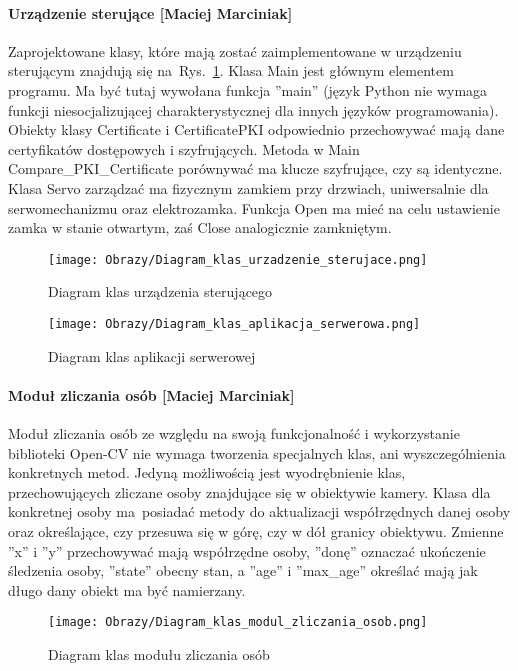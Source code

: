 \paragraph*{Urządzenie sterujące [Maciej Marciniak]}
Zaprojektowane klasy, które mają zostać zaimplementowane w urządzeniu sterującym znajdują się na~Rys.~\ref{diagram:Diagram_klas_urzadzenia_sterujacego}. Klasa Main jest głównym elementem programu. Ma być tutaj wywołana funkcja ''main'' (język Python nie wymaga funkcji niesocjalizującej charakterystycznej dla innych języków programowania). Obiekty klasy Certificate i CertificatePKI odpowiednio przechowywać mają dane certyfikatów dostępowych i szyfrujących. Metoda w Main Compare\_PKI\_Certificate porównywać ma klucze szyfrujące, czy są identyczne. Klasa Servo zarządzać ma fizycznym zamkiem przy drzwiach, uniwersalnie dla serwomechanizmu oraz elektrozamka. Funkcja Open ma mieć na celu ustawienie zamka w stanie otwartym, zaś Close analogicznie zamkniętym. 

\begin{figure}[!h]
	\centering
	\texttt{[image: Obrazy/Diagram\_klas\_urzadzenie\_sterujace.png]}
	\caption{Diagram klas urządzenia sterującego}
	\label{diagram:Diagram_klas_urzadzenia_sterujacego}
\end{figure}

\begin{landscape}
	\begin{figure}[!h]
		\centering
		\vspace{2.5cm}
		\texttt{[image: Obrazy/Diagram\_klas\_aplikacja\_serwerowa.png]}
		\caption{Diagram klas aplikacji serwerowej}
		\label{diagram:Diagram_klas_aplikacji_serwerowej}
	\end{figure}	
\end{landscape}

\paragraph*{Moduł zliczania osób [Maciej Marciniak]}
Moduł zliczania osób ze względu na swoją funkcjonalność i wykorzystanie biblioteki Open-CV nie wymaga tworzenia specjalnych klas, ani wyszczególnienia konkretnych metod. Jedyną możliwością jest wyodrębnienie klas, przechowujących zliczane osoby znajdujące się w obiektywie kamery. Klasa dla konkretnej osoby ma~posiadać metody do aktualizacji współrzędnych danej osoby oraz określające, czy przesuwa się w górę, czy w dół granicy obiektywu. Zmienne ''x'' i ''y'' przechowywać mają współrzędne osoby, ''donę'' oznaczać ukończenie śledzenia osoby, ''state'' obecny stan, a ''age'' i ''max\_age'' określać mają jak długo dany obiekt ma być namierzany.
\begin{figure}[!h]
	\centering
	\texttt{[image: Obrazy/Diagram\_klas\_modul\_zliczania\_osob.png]}
	\caption{Diagram klas modułu zliczania osób}
	\label{diagram:Diagram_klas_modul_zliczania_osob}
\end{figure}

